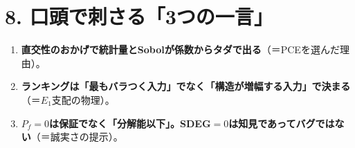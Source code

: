 \documentclass[11pt,a4paper]{ltjsarticle}
\begin{document}
\section*{8. 口頭で刺さる「3つの一言」}
\begin{enumerate}\itemsep2pt
  \item \textbf{直交性のおかげで統計量とSobolが係数からタダで出る}（＝PCEを選んだ理由）。
  \item \textbf{ランキングは「最もバラつく入力」でなく「構造が増幅する入力」で決まる}（＝$E_1$支配の物理）。
  \item \textbf{$P_f=0$は保証でなく「分解能以下」。SDEG$=0$は知見であってバグではない}（＝誠実さの提示）。
\end{enumerate}
\end{document}
